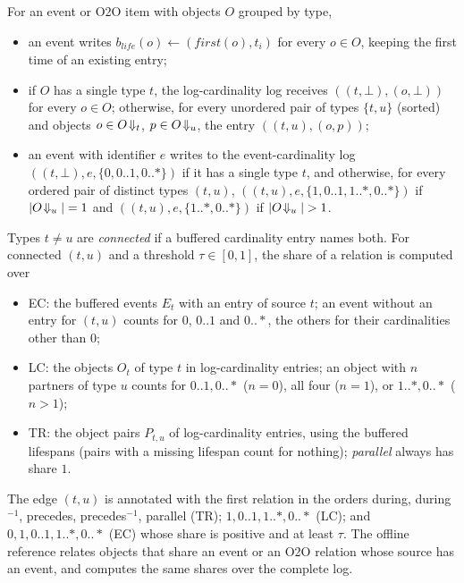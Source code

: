 \begin{definition}\label{def:totembuffers}
For an event or O2O item with objects $O$ grouped by type,
\begin{itemize}
  \item an event writes $b_{\mathit{life}}(o) \leftarrow (\mathit{first}(o), t_i)$
        for every $o \in O$, keeping the first time of an existing entry;
  \item if $O$ has a single type $t$, the log-cardinality log receives
        $((t, \bot), (o, \bot))$ for every $o \in O$; otherwise, for every
        unordered pair of types $\{t, u\}$ (sorted) and objects
        $o \in O\!\Downarrow_{t}$, $p \in O\!\Downarrow_{u}$, the entry $((t,u),(o,p))$;
  \item an event with identifier $e$ writes to the event-cardinality log
        $((t, \bot), e, \{0, 0..1, 0..*\})$ if it has a single type $t$, and
        otherwise, for every ordered pair of distinct types $(t,u)$,
        $((t,u), e, \{1, 0..1, 1..*, 0..*\})$ if $|O\!\Downarrow_{u}| = 1$ and
        $((t,u), e, \{1..*, 0..*\})$ if $|O\!\Downarrow_{u}| > 1$.
\end{itemize}
\end{definition}

\begin{definition}[TOTeM]\label{def:totem}
Types $t \ne u$ are \emph{connected} if a buffered cardinality entry names
both. For connected $(t,u)$ and a threshold $\tau \in [0,1]$, the share of a
relation is computed over
\begin{itemize}
  \item EC: the buffered events $E_t$ with an entry of source $t$; an event
        without an entry for $(t,u)$ counts for $0$, $0..1$ and $0..*$, the
        others for their cardinalities other than $0$;
  \item LC: the objects $O_t$ of type $t$ in log-cardinality entries; an
        object with $n$ partners of type $u$ counts for $0..1, 0..*$ ($n=0$),
        all four ($n=1$), or $1..*, 0..*$ ($n>1$);
  \item TR: the object pairs $P_{t,u}$ of log-cardinality entries, using the
        buffered lifespans (pairs with a missing lifespan count for nothing);
        \emph{parallel} always has share $1$.
\end{itemize}
The edge $(t,u)$ is annotated with the first relation in the orders
during, during$^{-1}$, precedes, precedes$^{-1}$, parallel (TR);
$1, 0..1, 1..*, 0..*$ (LC); and $0, 1, 0..1, 1..*, 0..*$ (EC) whose share is
positive and at least $\tau$. The offline reference relates objects that
share an event or an O2O relation whose source has an event, and computes the
same shares over the complete log.
\end{definition}

